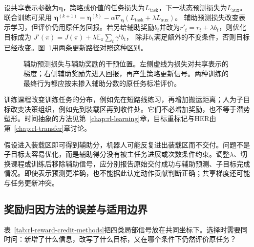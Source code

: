 设共享表示参数为$\bm{\eta}$，策略或价值的任务损失为$L_{\mathrm{task}}$，下一状态预测损失为$L_{\mathrm{aux}}$。联合训练可采用
$\bm{\eta}^{(k+1)}=\bm{\eta}^{(k)}
-\alpha\nabla_{\bm{\eta}}(L_{\mathrm{task}}+\lambda L_{\mathrm{aux}})$。
辅助预测损失改变表示学习，但评价仍用原任务回报。若另给辅助奖励$b_t$并改为$r'_t=r_t+\lambda b_t$，则优化目标成为
$J'(\pi)=J(\pi)+\lambda\mathbb E_\pi\sum_t\gamma^t b_t$，
除非$b_t$满足额外的不变条件，否则目标已经改变。图~\ref{fig:rl-reward-auxiliary}用两条更新路径对照这种区别。

\begin{figure}[htbp]
  \centering
  
  \caption{辅助预测损失与辅助奖励的干预位置。左侧虚线为损失对共享表示的梯度；右侧辅助奖励先进入回报，再产生策略更新信号。两种训练的最终行为都应按未掺入辅助分数的原任务标准评价。}
  \label{fig:rl-reward-auxiliary}
\end{figure}

训练课程改变训练任务的分布，例如先在短路线练习，再增加搬运距离；人为子目标改变决策组织，例如先到装载区再到收件处。它们不必增加奖励，也不等于潜势塑形。时间抽象的方法见第~\ref{chap:rl-learning}章，目标重标记与HER由第~\ref{chap:rl-transfer}章讨论。

假设进入装载区即可得到辅助分，机器人可能反复进出装载区而不交付。问题不是子目标太容易优化，而是辅助得分没有被主任务进展或次数条件约束。调整$\lambda$、切换课程或训练后移除辅助信号，应分别报告原始交付成功与辅助预测、子目标完成情况。即使表示预测更准确，也不能据此认定动作贡献判断正确；共享梯度还可能与任务更新冲突。

\subsection{奖励归因方法的误差与适用边界}
\label{sec:rl-reward-credit-boundaries}

表~\ref{tab:rl-reward-credit-methods}把四类局部信号放在共同坐标下。选择时需要同时问：新增了什么信息，改写了什么目标，又在哪个条件下仍然评价原任务？

